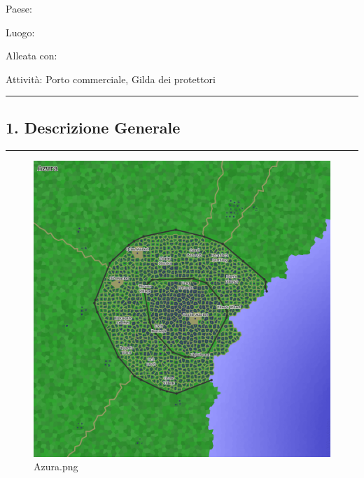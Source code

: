 Paese:

Luogo:

Alleata con:

Attività: Porto commerciale, Gilda dei protettori

\begin{center}\rule{0.5\linewidth}{0.5pt}\end{center}

\subsection{1. Descrizione Generale}\label{descrizione-generale}

\begin{center}\rule{0.5\linewidth}{0.5pt}\end{center}

\begin{figure}
\centering
\includegraphics{Azura.png}
\caption{Azura.png}
\end{figure}

